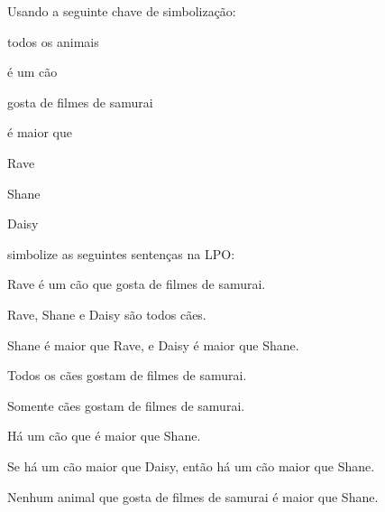 \problempart
Usando a seguinte chave de simbolização:
\begin{ekey}
\item[\text{domínio}] todos os animais
\item[\atom{D}{x}]  é um cão
\item[\atom{S}{x}]  gosta de filmes de samurai
\item[\atom{L}{x,y}]  é maior que 
\item[r] Rave
\item[h] Shane
\item[d] Daisy
\end{ekey}
simbolize as seguintes sentenças na LPO:
\begin{compactlist}
\item Rave é um cão que gosta de filmes de samurai.
\item[] 
\item Rave, Shane e Daisy são todos cães.
\item[] 
\item Shane é maior que Rave, e Daisy é maior que Shane.
\item[] 
\item Todos os cães gostam de filmes de samurai.
\item[] 
\item Somente cães gostam de filmes de samurai.
\item[] 
\item Há um cão que é maior que Shane.
\item[] 
\item Se há um cão maior que Daisy, então há um cão maior que Shane.
\item[] 
\item Nenhum animal que gosta de filmes de samurai é maior que Shane.
\item[] 

\end{compactlist}

